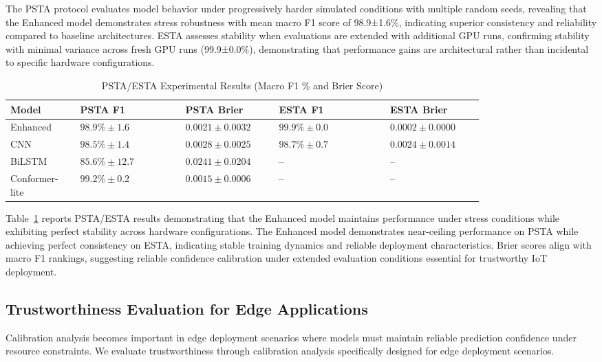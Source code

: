 \documentclass[journal]{IEEEtran}
\begin{document}
The PSTA protocol evaluates model behavior under progressively harder simulated conditions with multiple random seeds, revealing that the Enhanced model demonstrates stress robustness with mean macro F1 score of 98.9±1.6\%, indicating superior consistency and reliability compared to baseline architectures. ESTA assesses stability when evaluations are extended with additional GPU runs, confirming stability with minimal variance across fresh GPU runs (99.9±0.0\%), demonstrating that performance gains are architectural rather than incidental to specific hardware configurations.

\begin{table}[t]
\centering
\caption{PSTA/ESTA Experimental Results (Macro F1 \% and Brier Score)}
\label{tab:d5d6}
\begin{tabular}{p{0.11\linewidth} p{0.18\linewidth} p{0.16\linewidth} p{0.19\linewidth} p{0.16\linewidth}}
\toprule
\textbf{Model} & \textbf{PSTA F1} & \textbf{PSTA Brier} & \textbf{ESTA F1} & \textbf{ESTA Brier} \\ 
\midrule
Enhanced & $98.9\% \pm 1.6$ & $0.0021 \pm 0.0032$ & $99.9\% \pm 0.0$ & $0.0002 \pm 0.0000$ \\ 
CNN & $98.5\% \pm 1.4$ & $0.0028 \pm 0.0025$ & $98.7\% \pm 0.7$ & $0.0024 \pm 0.0014$ \\ 
BiLSTM & $85.6\% \pm 12.7$ & $0.0241 \pm 0.0204$ & -- & -- \\ 
Conformer-lite & $99.2\% \pm 0.2$ & $0.0015 \pm 0.0006$ & -- & -- \\ 
\bottomrule
\end{tabular}
\end{table}

Table~\ref{tab:d5d6} reports PSTA/ESTA results demonstrating that the Enhanced model maintains performance under stress conditions while exhibiting perfect stability across hardware configurations. The Enhanced model demonstrates near-ceiling performance on PSTA while achieving perfect consistency on ESTA, indicating stable training dynamics and reliable deployment characteristics. Brier scores align with macro F1 rankings, suggesting reliable confidence calibration under extended evaluation conditions essential for trustworthy IoT deployment.

\subsection{Trustworthiness Evaluation for Edge Applications}

Calibration analysis becomes important in edge deployment scenarios where models must maintain reliable prediction confidence under resource constraints. We evaluate trustworthiness through calibration analysis specifically designed for edge deployment scenarios.
\end{document}
